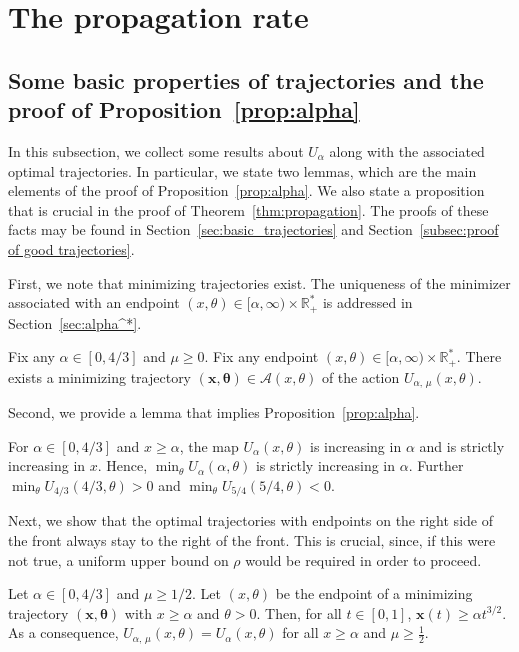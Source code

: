 \documentclass[AHL,Unicode,longabstracts]{cedram}
\newcommand{\R}{\mathbb{R}}
\newcommand{\bx}{\mathbf{x}}
\newcommand{\mA}{\mathcal{A}}
\newcommand{\btheta}{\boldsymbol{\theta}}
\newcommand{\1}{\mathds{1}}
\begin{document}
\section{The propagation rate}
\label{sec:contradiction}

\subsection{Some basic properties of trajectories and the proof of Proposition~\ref{prop:alpha}}\label{sec:prop:alpha}
In this subsection, we collect some results about $U_\alpha$ along with the associated optimal trajectories. In particular, we state two lemmas, which are the main elements of the proof of Proposition~\ref{prop:alpha}. We also state a proposition that is crucial in the proof of Theorem~\ref{thm:propagation}. The proofs of these facts may be found in Section~\ref{sec:basic_trajectories} and Section~\ref{subsec:proof of good trajectories}.

First, we note that minimizing trajectories exist. The uniqueness of the minimizer associated with an endpoint $(x,\theta)\in [\alpha,\infty)\times\R_+^*$ is addressed in Section~\ref{sec:alpha^*}.

\begin{lemm}\label{lem:minimizer_existence}
Fix any $\alpha \in [0,4/3]$ and $\mu \geq 0$. Fix any endpoint $(x,\theta) \in [\alpha,\infty)\times\R_+^*$. There exists a minimizing trajectory $(\bx,\btheta) \in \mA(x,\theta)$ of the action $U_{\alpha,\,\mu}(x,\theta)$.
\end{lemm}

Second, we provide a lemma that implies Proposition~\ref{prop:alpha}.

\begin{lemm}\label{lem:well-defined-alpha}
For $\alpha \in [0,4/3]$ and $x\geq \alpha$, the map $U_\alpha(x, \theta)$ is increasing in $\alpha$ and is strictly increasing in $x$. Hence, $\min_\theta U_\alpha(\alpha,\theta)$ is strictly increasing in $\alpha$. Further $\min_\theta U_{4/3}(4/3, \theta) >0$ and $\min_\theta U_{5/4}(5/4,\theta) <0$.
\end{lemm}


Next, we show that the optimal trajectories with endpoints on the right side of the front always stay to the right of the front. This is crucial, since, if this were not true, a uniform upper bound on $\rho$ would be required in order to proceed.

\begin{prop}\label{lem:good_trajectories}
Let $\alpha \in [0,4/3]$ and $\mu \geq 1/2$. Let $(x,\theta)$ be the endpoint of a minimizing trajectory $(\bx, \btheta)$ with $x \geq \alpha$ and $\theta > 0$. Then, for all $t \in [0,1]$, $\bx(t) \geq \alpha t^{3/2}$. As a consequence, $U_{\alpha,\,\mu}(x,\theta)= U_{\alpha }(x,\theta)$ for all $x\geq \alpha$ and $\mu\geq \frac 12$.
\end{prop}
\end{document}
